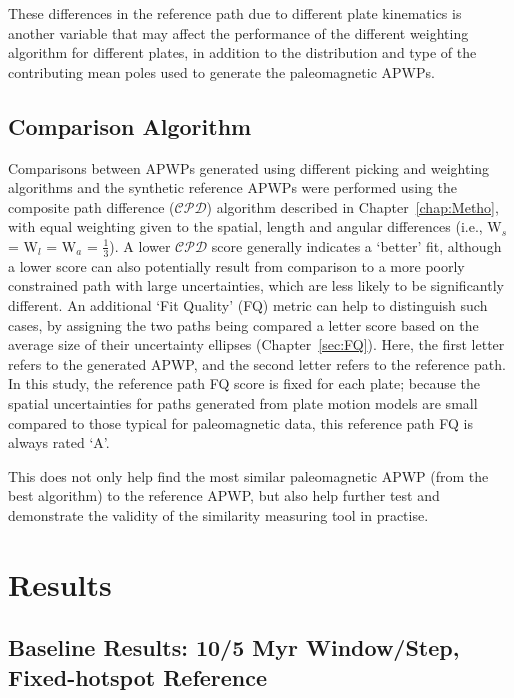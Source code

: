 These differences in the reference path due to different plate kinematics is
another variable that may affect the performance of the different weighting
algorithm for different plates, in addition to the distribution and type of the
contributing mean poles used to generate the paleomagnetic APWPs.

\subsection{Comparison Algorithm}

Comparisons between APWPs generated using different picking and weighting
algorithms and the synthetic reference APWPs were performed using the composite
path difference ($\mathcal{CPD}$) algorithm described in
Chapter~\ref{chap:Metho}, with equal weighting given to the spatial, length and
angular differences (i.e., W$_s$ = W$_l$ = W$_a$ = $\frac{1}{3}$). A lower
$\mathcal{CPD}$ score generally indicates a `better' fit, although a lower score
can also potentially result from comparison to a more poorly constrained path
with large uncertainties, which are less likely to be significantly different.
An additional `Fit Quality' (FQ) metric can help to distinguish such cases, by
assigning the two paths being compared a letter score based on the average size
of their uncertainty ellipses (Chapter~\ref{sec:FQ}). Here, the first letter
refers to the generated APWP, and the second letter refers to the reference
path. In this study, the reference path FQ score is fixed for each plate;
because the spatial uncertainties for paths generated from plate motion models
are small compared to those typical for paleomagnetic data, this reference path
FQ is always rated `A'.

This does not only help find the most similar paleomagnetic APWP (from the best
algorithm) to the reference APWP, but also help further test and demonstrate the
validity of the similarity measuring tool in practise.

\section{Results}

\subsection{Baseline Results: 10/5 Myr Window/Step, Fixed-hotspot
Reference}\label{sec:base}

